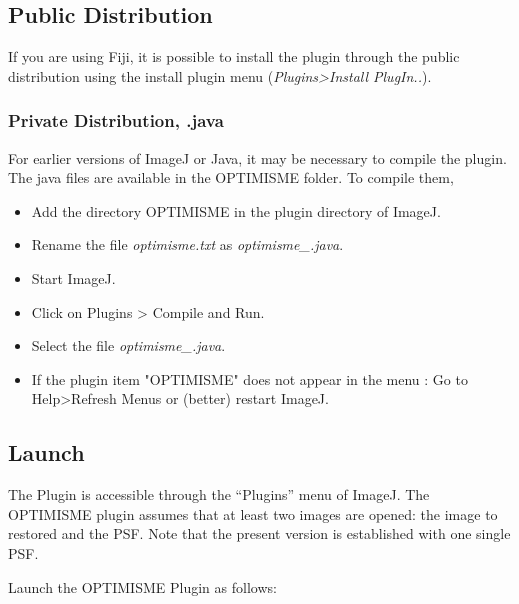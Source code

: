 \documentclass[12pt, a4paper]{scrartcl}
\begin{document}
\subsection{Public Distribution}
If you are using Fiji, it is possible to install the plugin through the public distribution using the install plugin menu (\emph{Plugins>Install PlugIn..}).

\subsubsection{Private Distribution, .java}
For earlier versions of ImageJ or Java, it may be necessary to compile the plugin. The java files are available in the OPTIMISME folder. To compile them, 
   \begin{itemize}
   \item Add the directory OPTIMISME in the plugin directory of ImageJ.
   \item Rename the file \textit{optimisme.txt} as  \textit{optimisme\_.java}.
   \item Start ImageJ. 
   \item Click on Plugins > Compile and Run.
   \item Select the  file \textit{optimisme\_.java}.
   \item If the plugin item "OPTIMISME" does not appear in the menu : Go to Help>Refresh Menus or (better) restart ImageJ. 
  \end{itemize} 
  
%  
%
\subsection{Launch}
The Plugin is accessible through the ``Plugins'' menu of ImageJ.
The OPTIMISME plugin  assumes that at least two images are opened: the image to restored and the PSF. 
Note that the present version is established with one single PSF.  

Launch the OPTIMISME Plugin as follows:
\end{document}
